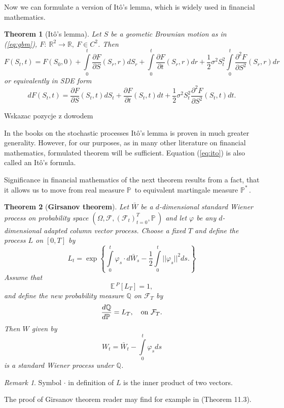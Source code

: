 \documentclass[a4paper,12pt, oneside]{book}
\newtheorem{thm}{Theorem}[section]
\theoremstyle{definition}
\theoremstyle{remark}
\newtheorem{remark}{Remark}
\def\E{{\mathbb{E}}\,}
\def\P{{\mathbb{P}}\,}
\def\Pm{{\mathbb{P}}^*\,}
\def\R{{\mathbb{R}}}
\begin{document}
\noindent Now we can formulate a version of It\^{o}'s lemma, which is widely used in financial mathematics.
\begin{thm}[It\^{o}'s lemma]
 \label{thm:ito}
  Let $S$ be a geometic Brownian motion as in (\ref{eq:gbm}), $F:\ \R^2 \rightarrow \R,\ F \in C^2$. Then 
  \begin{equation*}
   F(S_t, t) = F(S_0, 0) + \int\limits_0^t \frac{\partial F}{\partial S}(S_r,r)dS_r + \int\limits_0^t \frac{\partial F}{\partial t}(S_r,r)dr + \frac{1}{2}\sigma^2 S_t^2 \int\limits_0^t \frac{\partial^2 F}{\partial S^2}(S_r,r)dr
  \end{equation*}
  or equivalently in SDE form
  \begin{equation}
   \label{eq:ito}
   dF(S_t, t) = \frac{\partial F}{\partial S}(S_t,t)dS_t + \frac{\partial F}{\partial t}(S_t,t)dt + \frac{1}{2}\sigma^2 S_t^2 \frac{\partial^2 F}{\partial S^2}(S_t,t)dt   .
  \end{equation}  
\end{thm}
{\Large \color{red} Wskazac pozycje z dowodem}

\noindent In the books on the stochastic processes It\^{o}'s lemma is proven in much greater generality. However, for our purposes, as in many other literature on financial mathematics, formulated theorem will be sufficient. Equation (\ref{eq:ito}) is also called an It\^{o}'s formula.

Significance in financial mathematics of the next theorem results from a fact, that it allows us to move from real measure $\P$ to equivalent martingale measure $\Pm$.
\begin{thm}[\bfseries Girsanov theorem]
 \label{thm:girsanov}
 Let $\bar{W}$ be a $d$-dimensional standard Wiener process on probability space $(\Omega, \mathcal{F}, (\mathcal{F}_t)_{t=0}^T, \P)$ and let $\varphi$ be any $d$-dimensional adapted column vector process. Choose a fixed $T$ and define the process $L$ on $[0,T]$ by
 \[ L_t = \exp\left\{ \int\limits_0^t \varphi_s \cdot d\bar{W}_s - \frac{1}{2}\int\limits_0^t ||\varphi_s||^2ds. \right\} \]
 Assume that 
 \[ \E^P[L_T] = 1, \]
 and define the new probability measure $\mathbb{Q}$ on $\mathcal{F}_T$ by
 \[ \frac{d\mathbb{Q}}{d\P} = L_T,\ \ \hbox{ on } \mathcal{F}_T. \]
 Then $W$ given by
 \[W_t = \bar{W}_t - \int\limits_0^t \varphi_s ds\]
 is a standard Wiener process under $\mathbb{Q}$.
\end{thm}
\begin{remark}
 Symbol $\cdot$ in definition of $L$ is the inner product of two vectors. 
\end{remark}
The proof of Girsanov theorem reader may find for example in \cite{bjork} (Theorem 11.3).
\end{document}
